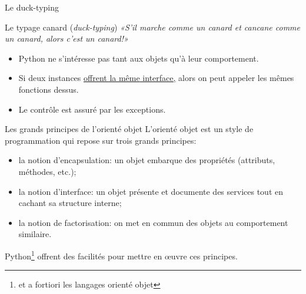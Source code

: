 \documentclass[dvipsnames]{beamer}
\begin{document}
\begin{frame}
    [fragile]{Le duck-typing}
    \begin{alertblock}
        {Le typage canard (\emph{duck-typing})}
        \vspace{.5em}
        \emph{«S'il marche comme un canard et cancane comme un canard, alors
            c'est un canard!»}
    \end{alertblock}
    \vspace{-1em}
    \begin{itemize}
        \item Python ne s'intéresse pas tant aux objets qu'à leur comportement.
        \item Si deux instances \alert{\underline{{\normalfont \color{black}
                              offrent la même} interface,}} alors on peut
              appeler les mêmes fonctions dessus.
        \item Le contrôle est assuré par les exceptions.\\
              \mbox{}\hfill\PointingHand{} \quad\mbox{}
    \end{itemize}

\end{frame}

\begin{frame}
    [fragile]{Les grands principes de l'orienté objet}
    L'orienté objet est un style de programmation qui repose sur trois
    grands principes:
    \begin{itemize}
        \item la notion d'\alert{encapsulation}: un objet embarque des
              propriétés (attributs, méthodes, etc.);
        \item la notion d'\alert{interface}: un objet présente et documente des
              services tout en cachant sa structure interne;
        \item la notion de \alert{factorisation}: on met en commun des objets au
              comportement similaire.
    \end{itemize}

    Python\footnote{et a fortiori les langages orienté objet} offrent des
    facilités pour mettre en œuvre ces principes.
\end{frame}

\end{document}
